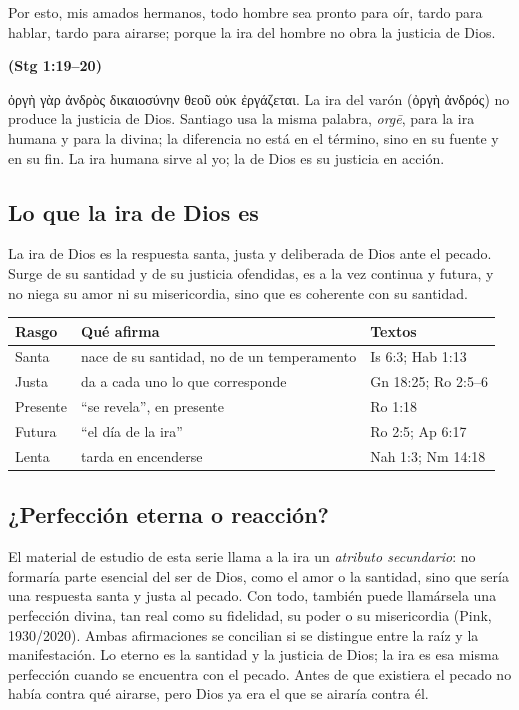 \documentclass[11pt,letterpaper]{article}
\newcommand{\grc}[1]{\foreignlanguage{ancientgreek}{#1}}
\newcommand{\fuente}[1]{\par\hfill{\upshape\bfseries\small\textcolor{azul}{#1}}}
\begin{document}
\begin{cita}Por esto, mis amados hermanos, todo hombre sea pronto para oír, tardo para hablar, tardo para airarse; porque la ira del hombre no obra la justicia de Dios.\fuente{(Stg 1:19--20)}\end{cita}

\begin{filologia}[Stg 1:20]
\grc{ὀργὴ γὰρ ἀνδρὸς δικαιοσύνην θεοῦ οὐκ ἐργάζεται}. La ira del varón (\grc{ὀργὴ ἀνδρός}) no produce la justicia de Dios. Santiago usa la misma palabra, \emph{orgē}, para la ira humana y para la divina; la diferencia no está en el término, sino en su fuente y en su fin. La ira humana sirve al yo; la de Dios es su justicia en acción.
\end{filologia}

\subsection{Lo que la ira de Dios es}
\begin{tcolorbox}[colback=papiro,colframe=azul,boxrule=1pt,arc=3pt,fonttitle=\bfseries\small,title=Definición]
La ira de Dios es la respuesta santa, justa y deliberada de Dios ante el pecado. Surge de su santidad y de su justicia ofendidas, es a la vez continua y futura, y no niega su amor ni su misericordia, sino que es coherente con su santidad.
\end{tcolorbox}

\begin{center}\small\renewcommand{\arraystretch}{1.25}
\begin{tabular}{@{}L{2.6cm}L{7.4cm}L{4.4cm}@{}}
\toprule
\textbf{Rasgo} & \textbf{Qué afirma} & \textbf{Textos} \\ \midrule
Santa & nace de su santidad, no de un temperamento & Is 6:3; Hab 1:13 \\
Justa & da a cada uno lo que corresponde & Gn 18:25; Ro 2:5--6 \\
Presente & ``se revela'', en presente & Ro 1:18 \\
Futura & ``el día de la ira'' & Ro 2:5; Ap 6:17 \\
Lenta & tarda en encenderse & Nah 1:3; Nm 14:18 \\
\bottomrule
\end{tabular}\end{center}

\subsection{¿Perfección eterna o reacción?}
El material de estudio de esta serie llama a la ira un \emph{atributo secundario}: no formaría parte esencial del ser de Dios, como el amor o la santidad, sino que sería una respuesta santa y justa al pecado. Con todo, también puede llamársela una perfección divina, tan real como su fidelidad, su poder o su misericordia (Pink, 1930/2020). Ambas afirmaciones se concilian si se distingue entre la raíz y la manifestación. Lo eterno es la santidad y la justicia de Dios; la ira es esa misma perfección cuando se encuentra con el pecado. Antes de que existiera el pecado no había contra qué airarse, pero Dios ya era el que se airaría contra él.
\end{document}
